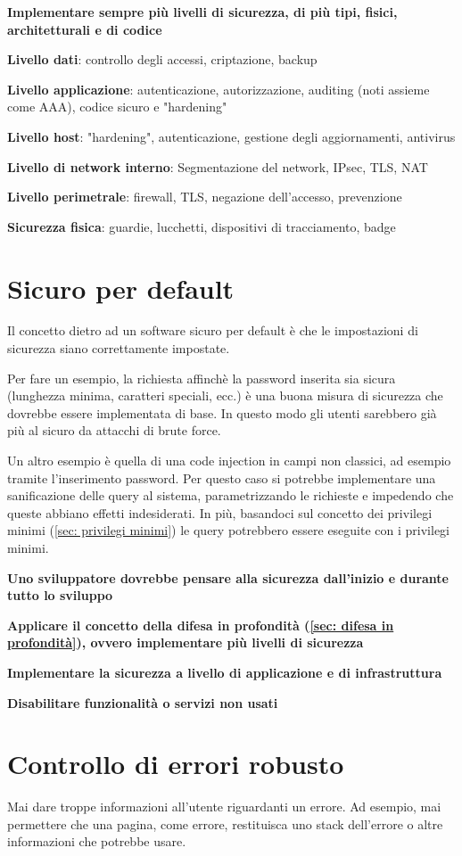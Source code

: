 \documentclass[11pt,a4paper]{book}
\begin{document}
\textbf{Implementare sempre più livelli di sicurezza, di più tipi, fisici, architetturali e di codice}

\textbf{Livello dati}: controllo degli accessi, criptazione, backup

\textbf{Livello applicazione}: autenticazione, autorizzazione, auditing (noti assieme come AAA), codice sicuro e "hardening"

\textbf{Livello host}: "hardening", autenticazione, gestione degli aggiornamenti, antivirus

\textbf{Livello di network interno}: Segmentazione del network, IPsec, TLS, NAT

\textbf{Livello perimetrale}: firewall, TLS, negazione dell'accesso, prevenzione

\textbf{Sicurezza fisica}: guardie, lucchetti, dispositivi di tracciamento, badge
\section{Sicuro per default}\label{sec: sicuro per default}
Il concetto dietro ad un software sicuro per default è che le impostazioni di sicurezza siano correttamente impostate.

Per fare un esempio, la richiesta affinchè la password inserita sia sicura (lunghezza minima, caratteri speciali, ecc.) è una buona misura di sicurezza che dovrebbe essere implementata di base. In questo modo gli utenti sarebbero già più al sicuro da attacchi di brute force.

Un altro esempio è quella di una code injection in campi non classici, ad esempio tramite l'inserimento password. Per questo caso si potrebbe implementare una sanificazione delle query al sistema, parametrizzando le richieste e impedendo che queste abbiano effetti indesiderati. In più, basandoci sul concetto dei privilegi minimi (\ref{sec: privilegi minimi}) le query potrebbero essere eseguite con i privilegi minimi.

\textbf{Uno sviluppatore dovrebbe pensare alla sicurezza dall'inizio e durante tutto lo sviluppo}

\textbf{Applicare il concetto della difesa in profondità (\ref{sec: difesa in profondità}), ovvero implementare più livelli di sicurezza}

\textbf{Implementare la sicurezza a livello di applicazione e di infrastruttura}

\textbf{Disabilitare funzionalità o servizi non usati}

\section{Controllo di errori robusto}
Mai dare troppe informazioni all'utente riguardanti un errore. Ad esempio, mai permettere che una pagina, come errore, restituisca uno stack dell'errore o altre informazioni che potrebbe usare.
\end{document}
